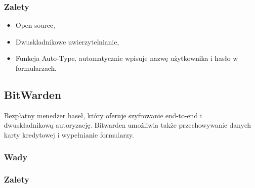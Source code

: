 \subsubsection{Zalety}
\begin{itemize}
    \item Open source,
    \item Dwuskladnikowe uwierzytelnianie,
    \item Funkcja Auto-Type, automatycznie wpisuje nazwę użytkownika i hasło w formularzach.
\end{itemize}


\subsection{BitWarden}

Bezpłatny menedżer haseł, który oferuje szyfrowanie end-to-end i dwuskładnikową autoryzację. Bitwarden umożliwia także przechowywanie danych karty kredytowej i wypełnianie formularzy.

\subsubsection{Wady}
\subsubsection{Zalety}